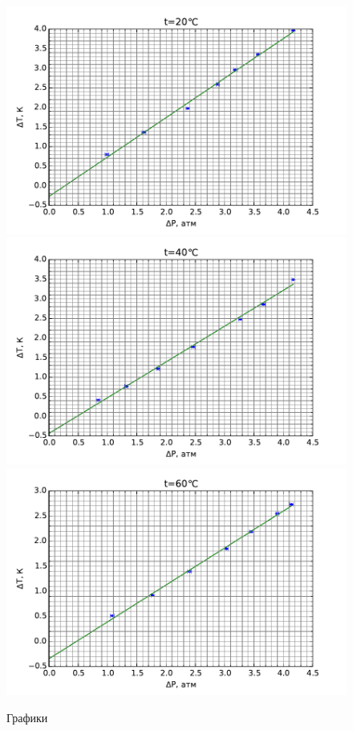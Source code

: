 \documentclass[12pt]{article}
\begin{document}
	\begin{figure}[!h]
	\caption{Графики}
	\label{fig:graphs}
	\begin{center}
	\includegraphics[scale=0.725]{graph0.pdf}
	\includegraphics[scale=0.725]{graph1.pdf}
	\includegraphics[scale=0.725]{graph2.pdf}
	\end{center}
	\end{figure}
	
\end{document}
